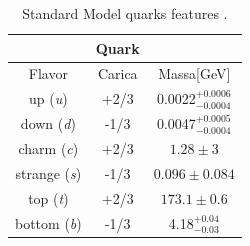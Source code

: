 \begin{table}[htbp]	
	\begin{center}
		\begin{tabular}{|ccc|}
			\hline    & \textbf{Quark} &   \\
			\hline   Flavor & Carica & Massa[GeV]  \\
			\hline
			\hline
			up (\emph{u}) & +2/3 & 0.0022$^{+0.0006}_{-0.0004}$ \\   
			down (\emph{d}) & -1/3 & 0.0047$^{+0.0005}_{-0.0004}$ \\
			\hline
			charm (\emph{c}) & +2/3 & $1.28\pm3$ \\
			strange (\emph{s}) & -1/3 & $0.096\pm0.084$ \\
			\hline
			top (\emph{t}) & +2/3 & $173.1\pm0.6$ \\
			bottom (\emph{b}) & -1/3 & 4.18$^{+0.04}_{-0.03}$ \\   
			\hline
			\hline
		\end{tabular}
	\end{center}
	\caption{Standard Model quarks features \cite{PDG}.}
	\label{quarkSM}
\end{table}

